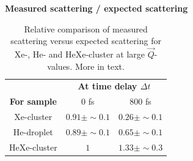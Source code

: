 \begin{table}%
\centering
\textbf{Measured scattering / expected scattering}\\
\begin{tabular}{ | c || c | c | }
\hline
	 &\multicolumn{2}{c|}{\textbf{At time delay $\Delta t$}} \\
	\textbf{For sample} & 0 fs  & 800 fs \\ \hline \hline
	Xe-cluster & $0.91\pm \sim 0.1$ & $0.26\pm \sim 0.1$ \\ \hline
	He-droplet & $0.89\pm \sim 0.1$ & $0.65\pm \sim 0.1$ \\ \hline
	HeXe-cluster & $1$ & $1.33\pm \sim 0.3$ \\ \hline
\end{tabular}
\caption[Relative comparison of measured scattering versus expected scattering.]{Relative comparison of measured scattering versus expected scattering for Xe-, He- and HeXe-cluster at large $\vec{Q}$-values. More in text.}
\label{tab:he-vs-xe-vs-hexe-summary}
\end{table}
